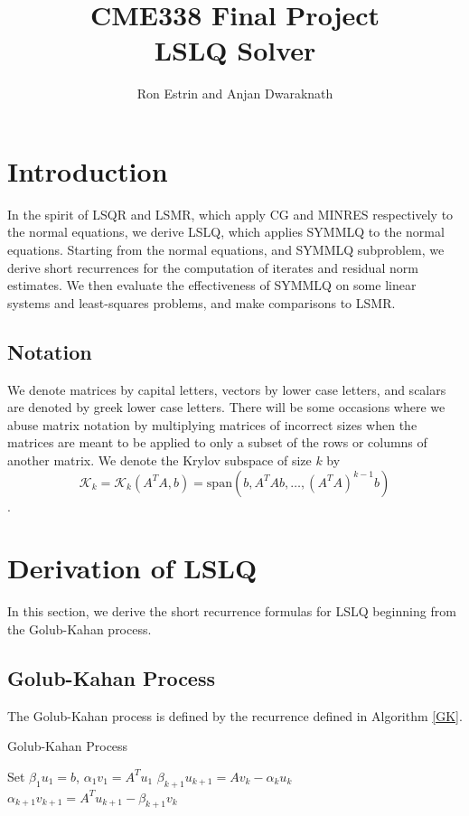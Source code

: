 \documentclass[11pt]{article}
\newcommand{\KK}{\mathcal{K}_k}
\begin{document}
\title{CME338 Final Project\\
LSLQ Solver }
\author{Ron Estrin and Anjan Dwaraknath}
\date{}
\maketitle

\section{Introduction}
In the spirit of LSQR and LSMR, which apply CG and MINRES respectively to the normal equations, we derive LSLQ, which applies SYMMLQ to the normal equations. Starting from the normal equations, and SYMMLQ subproblem, we derive short recurrences for the computation of iterates and residual norm estimates. We then evaluate the effectiveness of SYMMLQ on some linear systems and least-squares problems, and make comparisons to LSMR.

\subsection{Notation}
We denote matrices by capital letters, vectors by lower case letters, and scalars are denoted by greek lower case letters. There will be some occasions where we abuse matrix notation by multiplying matrices of incorrect sizes when the matrices are meant to be applied to only a subset of the rows or columns of another matrix.
We denote the Krylov subspace of size $k$ by 
$$\KK = \KK (A^T A, b) = \mathrm{span}\left(b, A^T A b, \dots, (A^T A)^{k-1} b \right)$$.

\section{Derivation of LSLQ}
In this section, we derive the short recurrence formulas for LSLQ beginning from the Golub-Kahan process.

\subsection{Golub-Kahan Process}
The Golub-Kahan process is defined by the recurrence defined in Algorithm \ref{GK}.

\begin{algorithm}
\caption{Golub-Kahan Process}
\label{GK}
\begin{algorithmic}
	\State Set $\beta_1 u_1 = b$, $\alpha_1 v_1 = A^T u_1$
		\State $\beta_{k+1} u_{k+1} = A v_k - \alpha_k u_k$
		\State $\alpha_{k+1} v_{k+1} = A^T u_{k+1} - \beta_{k+1} v_k$
	\EndFor
\end{algorithmic}
\end{algorithm}
\end{document}

